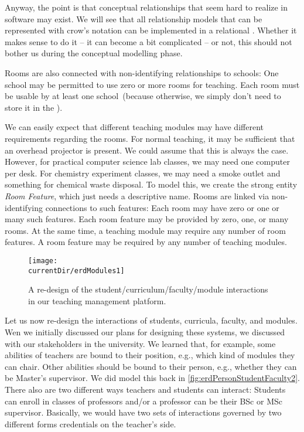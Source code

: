 Anyway, the point is that conceptual relationships that seem hard to realize in software may exist.
We will see that all relationship models that can be represented with crow's notation can be implemented in a relational \dbms.
Whether it makes sense to do it -- it can become a bit complicated -- or not, this should not bother us during the conceptual modelling phase.

Rooms are also connected with non-identifying relationships to schools:
One school may be permitted to use zero or more rooms for teaching.
Each room must be usable by at least one school~(because otherwise, we simply don't need to store it in the \db).

We can easily expect that different teaching modules may have different requirements regarding the rooms.
For normal teaching, it may be sufficient that an overhead projector is present.
We could assume that this is always the case.
However, for practical computer science lab classes, we may need one computer per desk.
For chemistry experiment classes, we may need a smoke outlet and something for chemical waste disposal.
To model this, we create the strong entity \emph{Room Feature}, which just needs a descriptive name.
Rooms are linked via non-identifying connections to such features:
Each room may have zero or one or many such features.
Each room feature may be provided by zero, one, or many rooms.
At the same time, a teaching module may require any number of room features.
A room feature may be required by any number of teaching modules.

\begin{figure}%
\centering%
\texttt{[image: \\currentDir/erdModules1]}%
\caption{A re-design of the student/curriculum/faculty/module interactions in our teaching management platform.}%
\label{fig:erdModules1}%
\end{figure}%
%
Let us now re-design the interactions of students, curricula, faculty, and modules.
Wen we initially discussed our plans for designing these systems, we discussed with our stakeholders in the university.
We learned that, for example, some abilities of teachers are bound to their position, e.g., which kind of modules they can chair.
Other abilities should be bound to their person, e.g., whether they can be Master's supervisor.
We did model this back in \cref{fig:erdPersonStudentFaculty2}.
There also are two different ways teachers and students can interact:
Students can enroll in classes of professors and/or a professor can be their BSc or MSc supervisor.
Basically, we would have two sets of interactions governed by two different forms credentials on the teacher's side.

